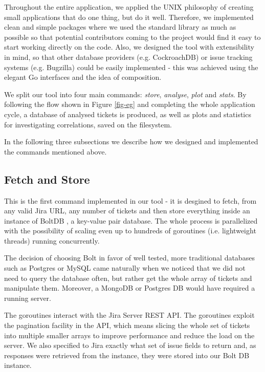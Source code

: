 \documentclass{mpaper}
\begin{document}
Throughout the entire application, we applied the UNIX philosophy of creating small applications that do one thing, but 
do it well. Therefore, we implemented clean and simple packages where we used the standard library as much as possible
so that potential contributors coming to the project would find it easy to start working directly on the code. Also, we designed 
the tool with extensibility in mind, so that other database providers (e.g. CockroachDB) or issue tracking systems (e.g. Bugzilla) 
could be easily implemented - this was achieved using the elegant Go interfaces and the idea of composition.  

We split our tool into four main commands: \emph{store}, \emph{analyse}, \emph{plot} and \emph{stats}. By following the flow shown in 
Figure \ref{fig-eg} and completing the whole application cycle, a database of analysed tickets is produced,
as well as plots and statistics for investigating correlations, saved on the filesystem.

In the following three subsections we describe how we designed and implemented the commands mentioned above.

\subsection{Fetch and Store}

This is the first command implemented in our tool - it is desgined to fetch, from any valid Jira URL, any number of tickets 
and then store everything inside an instance of BoltDB \cite{bolt}, a key-value pair 
database. The whole process is parallelized with the possibility of scaling even up to hundreds of goroutines
(i.e. lightweight threads) running concurrently. 

The decision of choosing Bolt in favor of well tested, more traditional databases such as Postgres or MySQL came naturally when 
we noticed that we did not need to query the database often, but rather get the whole array of tickets and manipulate them. Moreover, 
a MongoDB or Postgres DB would have required a running server. 

The goroutines interact with the Jira Server REST API. The goroutines exploit the pagination facility in the API, which means 
slicing the whole set of tickets into multiple smaller arrays to improve performance and reduce the load on the server. We also
specified to Jira exactly what set of issue fields to return and, as responses were retrieved from the instance,
they were stored into our Bolt DB instance. 
\end{document}
